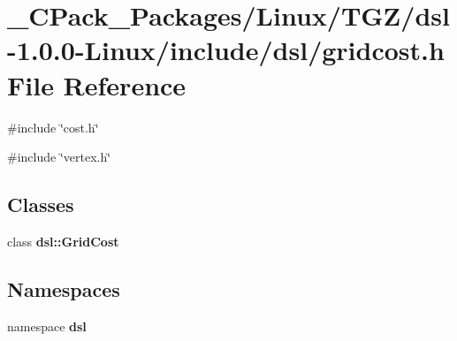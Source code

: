 \section{\_\-CPack\_\-Packages/Linux/TGZ/dsl-\/1.0.0-\/Linux/include/dsl/gridcost.h File Reference}
\label{__CPack__Packages_2Linux_2TGZ_2dsl-1_80_80-Linux_2include_2dsl_2gridcost_8h}
{\ttfamily \#include \char`\"{}cost.h\char`\"{}}\par
{\ttfamily \#include \char`\"{}vertex.h\char`\"{}}\par
\subsection*{Classes}
\begin{DoxyCompactItemize}
\item 
class {\bf dsl::GridCost}
\end{DoxyCompactItemize}
\subsection*{Namespaces}
\begin{DoxyCompactItemize}
\item 
namespace {\bf dsl}
\end{DoxyCompactItemize}
